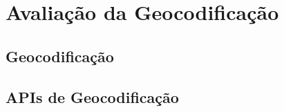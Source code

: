\chapter{Avaliação da Geocodificação} \label{RevisaoBibliografica}








\section{Geocodificação}


\section{APIs de Geocodificação}







